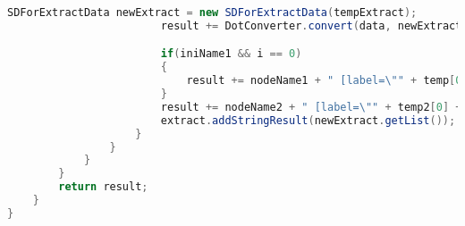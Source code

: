 \begin{lstlisting}[language=Java,basicstyle=\tiny,caption=DotConverter.java]
                        SDForExtractData newExtract = new SDForExtractData(tempExtract);
                        result += DotConverter.convert(data, newExtract, miningAlgo, deep+1, nodeName2);

                        if(iniName1 && i == 0)
                        {
                            result += nodeName1 + " [label=\"" + temp[0] + "\",shape=box,style=filled,color=\"1.0 " + color + " 1.0\"]\n";
                        }
                        result += nodeName2 + " [label=\"" + temp2[0] + "\",shape=box,style=filled,color=\"1.0 " + color + " 1.0\"]\n";
                        extract.addStringResult(newExtract.getList());
                    }
                }
            }
        }
        return result;
    }
}
\end{lstlisting}

